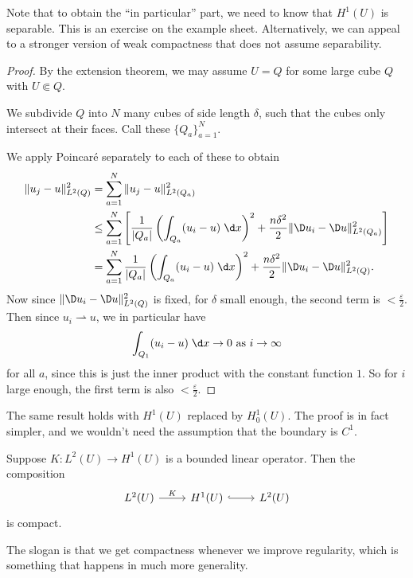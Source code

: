 \documentclass[a4paper]{article}
\begin{document}
Note that to obtain the ``in particular'' part, we need to know that $H^1(U)$ is separable. This is an exercise on the example sheet. Alternatively, we can appeal to a stronger version of weak compactness that does not assume separability.
\begin{proof}
  By the extension theorem, we may assume $U = Q$ for some large cube $Q$ with $U \Subset Q$.
%
%

  We subdivide $Q$ into $N$ many cubes of side length $\delta$, such that the cubes only intersect at their faces. Call these $\{Q_a\}_{a = 1}^N$.
%

  We apply Poincar\'e separately to each of these to obtain
  \begin{align*}
    \|u_j - u\|_{L^2(Q)}^2 &= \sum_{a = 1}^{N} \|u_j - u\|_{L^2(Q_a)}^2\\
    &\leq \sum_{a = 1}^{N} \left[\frac{1}{|Q_a|} \left(\int_{Q_a} (u_i - u)\;\d x\right)^2 + \frac{n \delta^2}{2} \|\D u_i - \D u\|^2_{L^2(Q_a)}\right]\\
    &= \sum_{a = 1}^{N} \frac{1}{|Q_a|} \left(\int_{Q_a} (u_i - u)\;\d x\right)^2 + \frac{n \delta^2}{2} \|\D u_i - \D u\|^2_{L^2(Q)}.
  \end{align*}
  Now since $\|\D u_i - \D u\|_{L^2(Q)}^2$ is fixed, for $\delta$ small enough, the second term is $< \frac{\varepsilon}{2}$. Then since $u_i \rightharpoonup u$, we in particular have
  \[
    \int_{Q_1} (u_i - u)\;\d x \to 0\text{ as }i \to \infty
  \]
  for all $a$, since this is just the inner product with the constant function $1$. So for $i$ large enough, the first term is also $< \frac{\varepsilon}{2}$.
\end{proof}

The same result holds with $H^1(U)$ replaced by $H^1_0(U)$. The proof is in fact simpler, and we wouldn't need the assumption that the boundary is $C^1$.

\begin{cor}
  Suppose $K: L^2(U) \to H^1(U)$ is a bounded linear operator. Then the composition
  \[
    \begin{tikzcd}
      L^2(U) \ar[r, "K"] & H^1(U) \ar[r, hook] & L^2(U)
    \end{tikzcd}
  \]
  is compact.
\end{cor}
The slogan is that we get compactness whenever we improve regularity, which is something that happens in much more generality.
\end{document}

